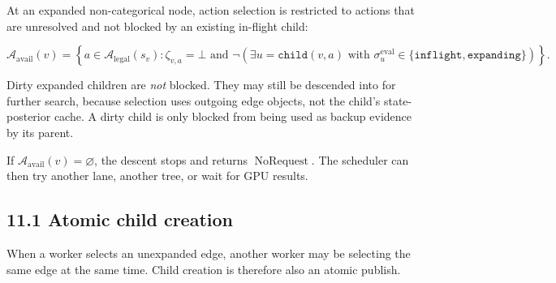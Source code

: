 \documentclass[11pt]{article}
\newcommand{\Legal}{\mathcal{A}_{\mathrm{legal}}}
\newcommand{\Available}{\mathcal{A}_{\mathrm{avail}}}
\newcommand{\NoRequest}{\operatorname{NoRequest}}
\begin{document}
At an expanded non-categorical node, action selection is restricted to actions
that are unresolved and not blocked by an existing in-flight child:

\[
\Available(v)
=
\left\{
 a\in\Legal(s_v):
 \zeta_{v,a}=\bot
 \text{ and }
 \neg\left(
   \exists u=\texttt{child}(v,a)
   \text{ with }
   \sigma^{\mathrm{eval}}_u\in\{\texttt{inflight},\texttt{expanding}\}
 \right)
\right\}.
\]

Dirty expanded children are \emph{not} blocked. They may still be descended into
for further search, because selection uses outgoing edge objects, not the
child's state-posterior cache. A dirty child is only blocked from being used as
backup evidence by its parent.

If \(\Available(v)=\varnothing\), the descent stops and returns \(\NoRequest\).
The scheduler can then try another lane, another tree, or wait for GPU results.

\subsection*{11.1 Atomic child creation}

When a worker selects an unexpanded edge, another worker may be selecting the
same edge at the same time. Child creation is therefore also an atomic publish.
\end{document}
